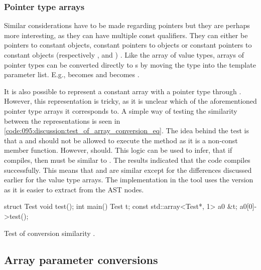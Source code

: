 \subsubsection*{Pointer type arrays}
Similar considerations have to be made regarding pointers but they are perhaps more interesting, as they can have multiple const qualifiers.
They can either be pointers to constant objects, constant pointers to objects or constant pointers to constant objects (respectively ,  and ) \cite{cppreferencePointerDeclarationCppreference}.
Like the array of value types, arrays of pointer types can be converted directly to s by moving the type into the template parameter list.
E.g.,  becomes  and  becomes .

It is also possible to represent a constant array with a pointer type through .
However, this representation is tricky, as it is unclear which of the aforementioned pointer type arrays it corresponds to.
A simple way of testing the similarity between the representations is seen in \cref{code:095:discussion:test_of_array_conversion_eq}.
The idea behind the test is that a  and  should not be allowed to execute the  method as it is a non-const member function. However,  should.
This logic can be used to infer, that if  compiles, then  must be similar to .
The results indicated that the code compiles successfully.
This means that  and  are similar except for the differences discussed earlier for the value type arrays. The implementation in the tool uses the  version as it is easier to extract from the AST nodes.


\begin{listing}[H]
    \begin{cppcode}
struct Test {void test(){}};
int main() {
    Test t;
    const std::array<Test*, 1> a0 {&t};
    a0[0]->test();
}
    \end{cppcode}
    \caption{Test of conversion similarity
    .}
    \label{code:095:discussion:test_of_array_conversion_eq}
\end{listing}


\subsection{Array parameter conversions}\label{subsec:095disc:arrayParm}

